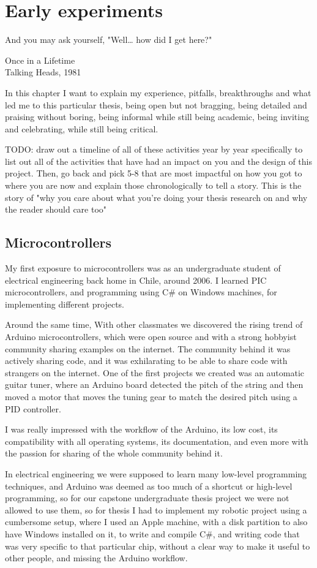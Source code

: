 \chapter{Early experiments}

\epigraph{And you may ask yourself, "Well… how did I get here?"}{Once in a Lifetime \\ Talking Heads, 1981}

In this chapter I want to explain my experience, pitfalls, breakthroughs and what led me to this particular thesis, being open but not bragging, being detailed and praising without boring, being informal while still being academic, being inviting and celebrating, while still being critical.

TODO: draw out a timeline of all of these activities year by year specifically to list out all of the activities that have had an impact on you and the design of this project.
Then, go back and pick 5-8 that are most impactful on how you got to where you are now and explain those chronologically to tell a story. This is the story of "why you care about what you're doing your thesis research on and why the reader should care too"

\section{Microcontrollers}

My first exposure to microcontrollers was as an undergraduate student of electrical engineering back home in Chile, around 2006. I learned PIC microcontrollers, and programming using C\# on Windows machines, for implementing different projects.

Around the same time, With other classmates we discovered the rising trend of Arduino microcontrollers, which were open source and with a strong hobbyist community sharing examples on the internet. The community behind it was actively sharing code, and it was exhilarating to be able to share code with strangers on the internet. One of the first projects we created was an automatic guitar tuner, where an Arduino board detected the pitch of the string and then moved a motor that moves the tuning gear to match the desired pitch using a PID controller.

I was really impressed with the workflow of the Arduino, its low cost, its compatibility with all operating systems, its documentation, and even more with the passion for sharing of the whole community behind it.

In electrical engineering we were supposed to learn many low-level programming techniques, and Arduino was deemed as too much of a shortcut or high-level programming, so for our capstone undergraduate thesis project we were not allowed to use them, so for thesis I had to implement my robotic project using a cumbersome setup, where I used an Apple machine, with a disk partition to also have Windows installed on it, to write and compile C\#, and writing code that was very specific to that particular chip, without a clear way to make it useful to other people, and missing the Arduino workflow.

